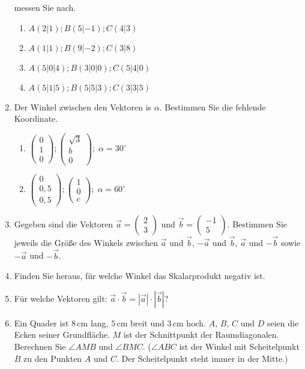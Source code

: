 \documentclass[12pt,a4paper,twoside,fleqn]{article}
\begin{document}
\begin{enumerate}
  messen Sie nach.
  \begin{multicols}{2}
    \begin{enumerate}
    \item $A(2|1); B(5|-1); C(4|3)$
    \item $A(1|1); B(9|-2); C(3|8)$
    \item $A(5|0|4); B(3|0|0); C(5|4|0)$
    \item $A(5|1|5); B(5|5|3); C(3|3|5)$
    \end{enumerate}
  \end{multicols}
\item Der Winkel zwischen den Vektoren is $\alpha$. Bestimmen Sie die
  fehlende Koordinate.
  \begin{multicols}{2}
    \begin{enumerate}
     \item  $\begin{pmatrix}
      0\\1\\0
    \end{pmatrix};
   \begin{pmatrix}
      \sqrt{3}\\b\\0
    \end{pmatrix}; \;
    \alpha = 30^\circ$ 
  \item  $\begin{pmatrix}
      0\\0,5\\0,5
    \end{pmatrix};
   \begin{pmatrix}
      1\\0\\c
    \end{pmatrix};\;
    \alpha = 60^\circ$
    \end{enumerate}
  \end{multicols}
\item Gegeben sind die Vektoren
  $\vec{a}=\begin{pmatrix} 2\\3 \end{pmatrix}$ und 
  $\vec{b}=\begin{pmatrix} -1\\5 \end{pmatrix}$. Bestimmen Sie jeweils
  die Größe des Winkels zwischen $\vec{a}$ und $\vec{b}$, $-\vec{a}$
  und $\vec{b}$, $\vec{a}$ und $-\vec{b}$ sowie $-\vec{a}$ und $-\vec{b}$.
\item Finden Sie heraus, für welche Winkel das Skalarprodukt negativ ist.
\item Für welche Vektoren gilt: $ \vec{a}\cdot\vec{b}=  |\vec{a}|\cdot|\vec{b}|$?
\item Ein Quader ist $8\,$cm lang, $5\,$cm breit und $3\,$cm
  hoch. $A$, $B$, $C$ und $D$ seien die Ecken seiner Grundfläche. $M$
  ist der Schnittpunkt der Raumdiagonalen. Berechnen Sie $\angle AMB$
  und $\angle BMC$. ($\angle ABC$ ist der Winkel mit Scheitelpunkt $B$
  zu den Punkten $A$ und $C$. Der Scheitelpunkt steht immer in der Mitte.)
\end{enumerate}
\newpage
\end{document}
